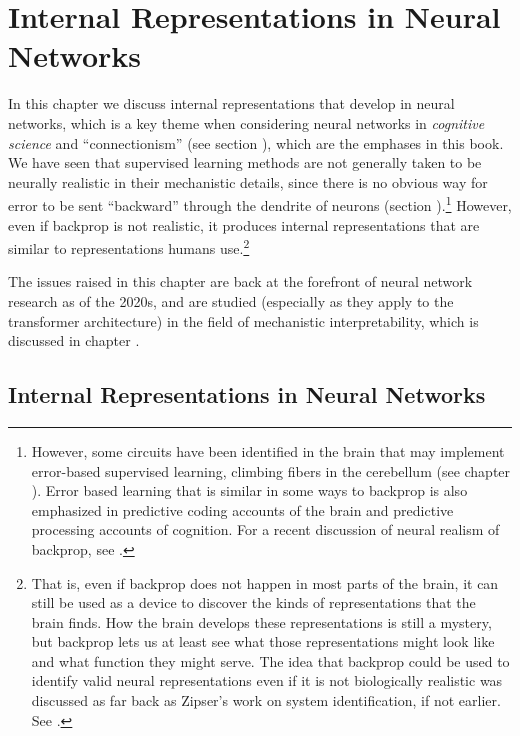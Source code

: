 \chapter{Internal Representations in Neural Networks}\label{ch_representations}

In this chapter we discuss internal representations that develop in neural networks, which is a key theme when considering neural networks in \emph{cognitive science} and ``connectionism'' (see section ), which are the emphases in this book. We have seen that  supervised learning methods are not generally taken to be neurally realistic in their mechanistic details, since there is no obvious way for error to be sent ``backward'' through the dendrite of neurons (section ).\footnote{However, some circuits have been identified in the brain that may implement error-based supervised learning, \eg climbing fibers in the cerebellum (see chapter ). Error based learning that is similar in some ways to backprop is also emphasized in predictive coding accounts of the brain and predictive processing accounts of cognition. For a  recent discussion of neural realism of backprop, see \cite{whittington2019theories}.}  However, even if backprop is not realistic, it produces internal representations that are similar to representations humans use.\footnote{That is, even if backprop does not happen in most parts of the brain, it can still be used as a device to discover the kinds of representations that the brain finds. How the brain develops these representations is still a mystery, but backprop lets us at least see what those representations might look like and what function they might serve. The idea that backprop could be used to identify valid neural representations even if it is not biologically realistic was discussed as far back as Zipser's work on system identification, if not earlier. See \cite{zipser1992identification}.}

The issues raised in this chapter are back at the forefront of neural network research as of the 2020s, and are studied (especially as they apply to the transformer architecture) in the field  of mechanistic interpretability, which is discussed in chapter .

\section{Internal Representations in Neural Networks}

